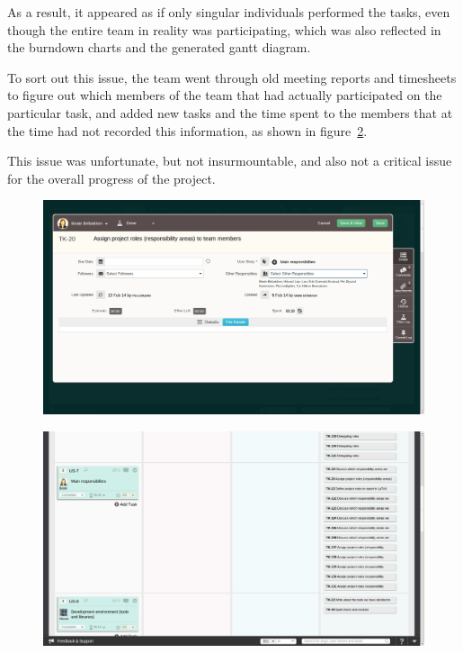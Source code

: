 As a result, it appeared as if only singular individuals performed the tasks, even though the entire team in reality was participating, which was also reflected in the burndown charts and the generated gantt diagram. 

To sort out this issue, the team went through old meeting reports and timesheets to figure out which members of the team that had actually participated on the particular task, and added new tasks and the time spent to the members that at the time had not recorded this information, as shown in figure~\ref{fig:addsTasks}.

This issue was unfortunate, but not insurmountable, and also not a critical issue for the overall progress of the project.

\begin{figure}[H]
\includegraphics[width=\textwidth]{ch/sprints/fig/wrongUse.png}
\label{fig:wrongUse}
\end{figure}

\begin{figure}[H]
\includegraphics[width=\textwidth]{ch/sprints/fig/addsTasks.png}
\label{fig:addsTasks}
\end{figure}

